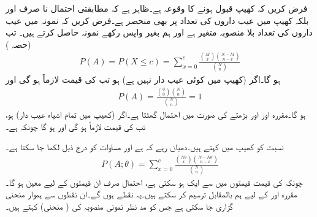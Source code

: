 فرض کریں کہ کھیپ قبول ہونے کا وقوعہ  ہے۔ظاہر ہے کہ مطابقتی احتمال  نا صرف  اور  بلکہ کھیپ میں عیب داروں کی تعداد  پر بھی منحصر ہے۔فرض کریں کہ نمونہ میں عیب داروں کی تعداد بلا منصوبہ متغیر  ہے اور ہم بغیر واپس رکھے  نمونہ حاصل کرتے ہیں۔ تب (حصہ )
\begin{align}\label{مساوات_شماریات_نسبت_عیب_دار_الف}
P(A)=P(X\le c)=\sum_{x=0}^{c}\frac{\binom{M}{x}\binom{N-M}{n-x}}{\binom{N}{n}}
\end{align}
ہو گا۔اگر  (کھیپ میں کوئی عیب دار نہیں ہے) ہو تب  کی قیمت لازماً  ہو گی اور
\begin{align*}
P(A)=\frac{\binom{0}{0}\binom{N}{n}}{\binom{N}{n}}=1
\end{align*}
ہو گا۔مقررہ  اور  اور بڑھتے  کی صورت میں احتمال  گھٹتا ہے۔اگر  (کھیپ میں تمام اشیاء عیب دار) ہو، تب  کی قیمت لازماً  ہو گی اور  ہو گا چونکہ  ہے۔

نسبت  کو کھیپ میں  کہتے ہیں۔دھیان رہے کہ  ہے اور مساوات  کو درج ذیل لکھا جا سکتا ہے۔
\begin{align}\label{مساوات_شماریات_نسبت_عیب_دار_ب}
P(A;\theta)=\sum_{x=0}^{c}\frac{\binom{N\theta}{x}\binom{N-N\theta}{n-x}}{\binom{N}{n}}
\end{align}
چونکہ  کی قیمت  قیمتوں  میں سے ایک ہو سکتی ہے، احتمال   صرف ان قیمتوں  کے لیے  معین ہو گا۔مقررہ  اور  کے لیے ہم  بالمقابل  ترسیم کر سکتے ہیں۔یہ  نقطے ہوں گے۔ان نقطوں سے ہموار منحنی گزاری جا سکتی ہے جس کو مد نظر نمونی منصوبہ کی  ( منحنی)  کہتے ہیں۔

